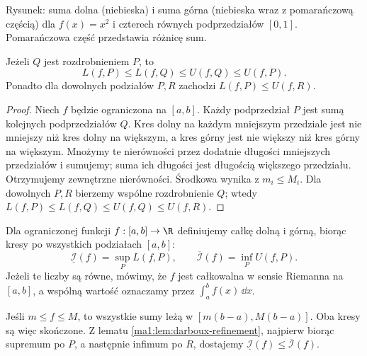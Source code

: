 \begin{center}

\small Rysunek: suma dolna (niebieska) i suma górna (niebieska wraz z pomarańczową częścią) dla $f(x)=x^2$ i czterech równych podprzedziałów $[0,1]$. Pomarańczowa część przedstawia różnicę sum.
\end{center}

\begin{lemat}
\label{ma1:lem:darboux-refinement}
Jeżeli $Q$ jest rozdrobnieniem $P$, to
\[
 L(f,P)\le L(f,Q)\le U(f,Q)\le U(f,P).
\]
Ponadto dla dowolnych podziałów $P,R$ zachodzi $L(f,P)\le U(f,R)$.
\end{lemat}
\begin{proof}
Niech $f$ będzie ograniczona na $[a,b]$. Każdy podprzedział $P$ jest sumą kolejnych podprzedziałów $Q$. Kres dolny na każdym mniejszym przedziale jest nie mniejszy niż kres dolny na większym, a kres górny jest nie większy niż kres górny na większym. Mnożymy te nierówności przez dodatnie długości mniejszych przedziałów i sumujemy; suma ich długości jest długością większego przedziału. Otrzymujemy zewnętrzne nierówności. Środkowa wynika z $m_i\le M_i$. Dla dowolnych $P,R$ bierzemy wspólne rozdrobnienie $Q$; wtedy $L(f,P)\le L(f,Q)\le U(f,Q)\le U(f,R)$.
\end{proof}
\begin{definicja}
\label{ma1:def:riemann-integral}
Dla ograniczonej funkcji $f:[a,b]\to\R$ definiujemy całkę dolną i górną, biorąc kresy po wszystkich podziałach $[a,b]$:
\[
 \underline{\mathcal I}(f)=\sup_P L(f,P),\qquad
 \overline{\mathcal I}(f)=\inf_P U(f,P).
\]
Jeżeli te liczby są równe, mówimy, że $f$ jest całkowalna w sensie Riemanna na $[a,b]$, a wspólną wartość oznaczamy przez $\int_a^b f(x)\,\dd x$.
\end{definicja}
Jeśli $m\le f\le M$, to wszystkie sumy leżą w $[m(b-a),M(b-a)]$. Oba kresy są więc skończone. Z lematu \ref{ma1:lem:darboux-refinement}, najpierw biorąc supremum po $P$, a następnie infimum po $R$, dostajemy $\underline{\mathcal I}(f)\le\overline{\mathcal I}(f)$.


